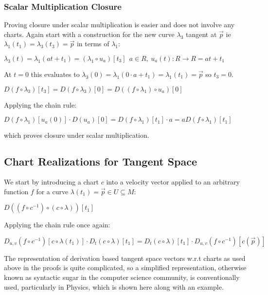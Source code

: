 \documentclass[11pt]{article}
\begin{document}
\hypertarget{scalar-multiplication-closure}{%
\subsubsection{Scalar Multiplication
Closure}\label{scalar-multiplication-closure}}

Proving closure under scalar multiplication is easier and does not
involve any charts. Again start with a construction for the new curve
\(\lambda_3\) tangent at \(\vec{p}\) ie
\(\lambda_1(t_1) = \lambda_3(t_3) = \vec{p}\) in terms of \(\lambda_1\):

\(\lambda_3(t) = \lambda_1(a t + t_1) = (\lambda_1 \circ u_a)[t_3]~~a \in R,~u_a(t) :R \rightarrow R = a t + t_1\)

At \(t = 0\) this evaluates to
\(\lambda_3(0) = \lambda_1(0 \cdot a + t_1) = \lambda_1(t_1) = \vec{p}\)
so \(t_3 = 0\).

\(D(f \circ \lambda_3)[t_3] = D(f \circ \lambda_3)[0] = D((f \circ \lambda_1) \circ u_a)[0]\)

Applying the chain rule:

\(D(f \circ \lambda_1)[u_a(0)] \cdot D(u_a)[0] = D(f \circ \lambda_1)[t_1] \cdot a = a D(f \circ \lambda_1)[t_1]\)

which proves closure under scalar multiplication.

    \hypertarget{chart-realizations-for-tangent-space}{%
\subsection{Chart Realizations for Tangent
Space}\label{chart-realizations-for-tangent-space}}

We start by introducing a chart \(c\) into a velocity vector applied to
an arbitrary function \(f\) for a curve
\(\lambda(t_1) = \vec{p} \in U \subseteq M\):

\(D((f \circ c^{-1}) \circ (c \circ \lambda))[t_1]\)

Applying the chain rule once again:

\(D_{u,v}(f \circ c^{-1})[c \circ \lambda(t_1)] \cdot D_t(c \circ \lambda)[t_1] = D_t(c \circ \lambda)[t_1] \cdot D_{u,v}(f \circ c^{-1})[c(\vec{p})]\)

The representation of derivation based tangent space vectors w.r.t
charts as used above in the proofs is quite complicated, so a simplified
representation, otherwise known as syntactic sugar in the computer
science community, is conventionally used, particularly in Physics,
which is shown here along with an example.
\end{document}
